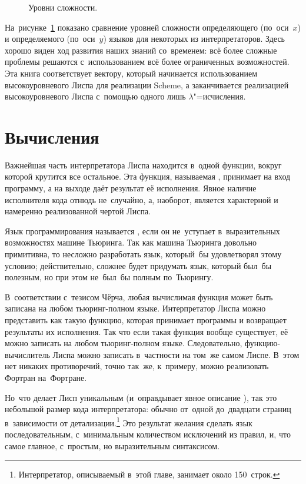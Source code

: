 \begin{figure}\centering

\caption{Уровни сложности.}\label{basics/fig:richness-plot}
\end{figure}

На~рисунке~\ref{basics/fig:richness-plot} показано сравнение уровней сложности
определяющего (по~оси~$x$) и определяемого (по~оси~$y$) языков для некоторых из
интерпретаторов. Здесь хорошо виден ход развития наших знаний со~временем: всё
более сложные проблемы решаются с~использованием всё более ограниченных
возможностей. Эта книга соответствует вектору, который начинается использованием
высокоуровневого Лиспа для реализации Scheme, а заканчивается реализацией
высокоуровневого Лиспа с~помощью одного лишь $\lambda$"=исчисления.


\section{Вычисления}\label{basics/sect:evaluation}

Важнейшая часть интерпретатора Лиспа находится в~одной функции, вокруг которой
крутится все остальное. Эта функция, называемая , принимает на вход
программу, а на выходе даёт результат её исполнения. Явное наличие исполнителя
кода отнюдь не~случайно, а, наоборот, является характерной и намеренно
реализованной чертой Лиспа.

Язык программирования называется , если он не~уступает
в~выразительных возможностях машине Тьюринга. Так как машина Тьюринга довольно
примитивна, то несложно разработать язык, который~бы удовлетворял этому условию;
действительно, сложнее будет придумать язык, который был~бы полезным, но при
этом не~был~бы полным по~Тьюрингу.

В~соответствии с~тезисом Чёрча, любая вычислимая функция может быть записана на
любом тьюринг-полном языке. Интерпретатор Лиспа можно представить как такую
функцию, которая принимает программы и возвращает результаты их исполнения. Так
что если такая функция вообще существует, её можно записать на любом
тьюринг-полном языке. Следовательно, функцию-вычислитель Лиспа  можно
записать в~частности на том~же самом Лиспе. В~этом нет никаких противоречий,
точно так~же, к~примеру, можно реализовать Фортран на~Фортране.

Но~что делает Лисп уникальным (и~оправдывает явное описание ), так это
небольшой размер кода интерпретатора: обычно от~одной до~двадцати страниц
в~зависимости от детализации.\footnote*{Интерпретатор, описываемый в~этой главе,
занимает около 150~строк.} Это результат желания сделать язык последовательным,
с~минимальным количеством исключений из правил, и, что самое главное, с~простым,
но выразительным синтаксисом.

